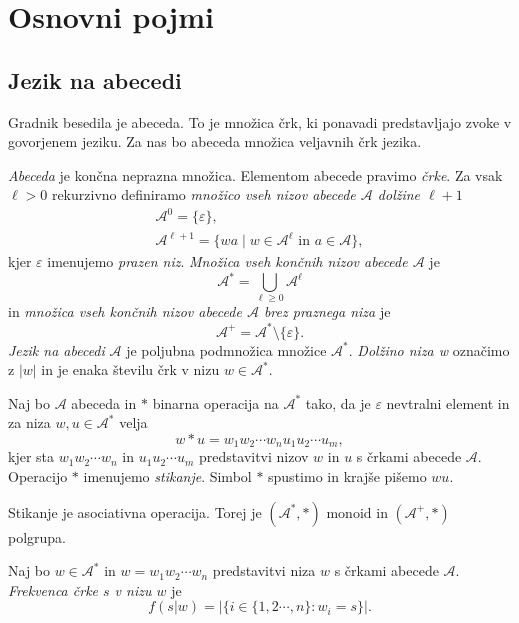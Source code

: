 \documentclass[fin1, tisk]{fmfdelo}
\providecommand{\abs}[1]{\left\lvert #1 \right\rvert}
\newcommand{\A}{\mathcal{A}}
\theoremstyle{definition}
\begin{document}
\section{Osnovni pojmi}

\subsection{Jezik na abecedi}
Gradnik besedila je abeceda. To je množica črk, ki ponavadi predstavljajo zvoke v govorjenem
jeziku. Za nas bo abeceda množica veljavnih črk jezika.

\begin{definicija}
    \emph{Abeceda} je končna neprazna množica. Elementom abecede pravimo \emph{črke}.
    Za vsak $\ell > 0$ rekurzivno definiramo \emph{množico vseh nizov abecede $\A$ dolžine 
    $\ell + 1$}
    \begin{gather*}
        \A^0 = \{ \varepsilon \}, \\
        \A^{\ell+1} = \{ wa \mid w \in \A^{\ell} \text{ in } a \in \A \},
    \end{gather*}
    kjer $\varepsilon$ imenujemo \emph{prazen niz}.
    \emph{Množica vseh končnih nizov abecede $\A$} je
    \[
        \A^* = \bigcup_{\ell \geq 0} \A^\ell
    \]
    in \emph{množica vseh končnih nizov abecede $\A$ brez praznega niza} je
    \[
        \A^+ = \A^* \setminus \{ \varepsilon \}.
    \]
    \emph{Jezik na abecedi} $\A$ je poljubna podmnožica množice $\A^*$. 
    \emph{Dolžino niza w} označimo z $\abs{w}$ in je enaka številu črk v nizu $ w \in \A^* $.
\end{definicija}

\begin{definicija}
    Naj bo $\A$ abeceda in $*$ binarna operacija na $\A^*$ tako, da je $\varepsilon$ 
    nevtralni element in za niza $ w, u \in \A^* $ velja
    \[
        w*u = w_1w_2 \cdots w_nu_1u_2 \cdots u_m,
    \]
    kjer sta $w_1w_2 \cdots w_n$ in $u_1u_2 \cdots u_m$ predstavitvi nizov $w$ in $u$ s črkami
    abecede $\A$. Operacijo $*$ imenujemo \emph{stikanje}. Simbol $*$ spustimo in 
    krajše pišemo $wu$.
\end{definicija}

\begin{opomba}
    Stikanje je asociativna operacija. Torej je $(\A^*, *)$ monoid in $(\A^+, *)$ polgrupa.
\end{opomba}

\begin{definicija}
    Naj bo $w \in \A^*$ in $w = w_1w_2 \cdots w_n$ predstavitvi niza $w$ s črkami abecede 
    $\A$. \emph{Frekvenca črke $s$ v nizu $w$} je
    \[
        f(s|w) = \abs{ \bigl\{ i \in \{1, 2 \cdots, n\} \colon w_i = s \bigr\} }.
    \]
\end{definicija}
\end{document}
